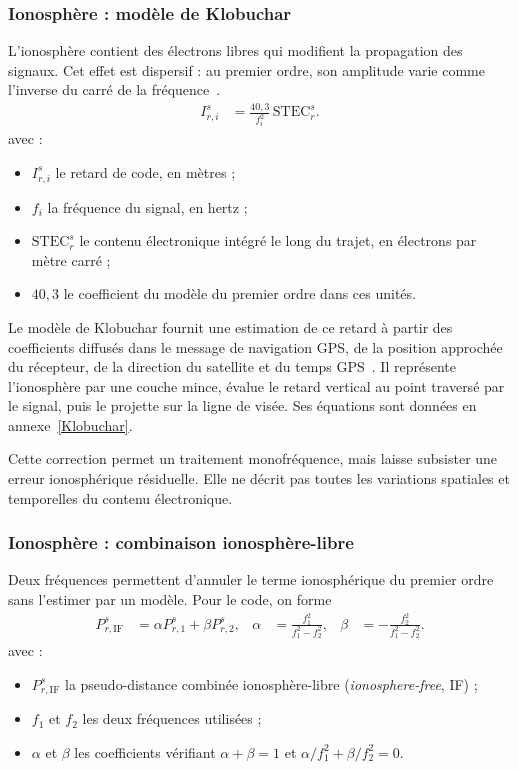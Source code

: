 \subsubsection{Ionosphère : modèle de Klobuchar}

L'ionosphère contient des électrons libres qui modifient la propagation des
signaux. Cet effet est dispersif : au premier ordre, son amplitude varie
comme l'inverse du carré de la fréquence~\cite{hauschild2017observations}.
\begin{align}
I_{r,i}^s&=\frac{40{,}3}{f_i^2}\,\mathrm{STEC}_r^s.
\label{new:iono}
\end{align}
avec :
\begin{itemize}
\item $I_{r,i}^s$ le retard de code, en mètres ;
\item $f_i$ la fréquence du signal, en hertz ;
\item $\mathrm{STEC}_r^s$ le contenu électronique intégré le long du trajet,
en électrons par mètre carré ;
\item $40{,}3$ le coefficient du modèle du premier ordre dans ces unités.
\end{itemize}

Le modèle de Klobuchar fournit une estimation de ce retard à partir des
coefficients diffusés dans le message de navigation GPS, de la position
approchée du récepteur, de la direction du satellite et du temps
GPS~\cite{klobuchar1987}. Il représente l'ionosphère par une couche mince,
évalue le retard vertical au point traversé par le signal, puis le projette
sur la ligne de visée. Ses équations sont données en annexe~\ref{Klobuchar}.

Cette correction permet un traitement monofréquence, mais laisse subsister
une erreur ionosphérique résiduelle. Elle ne décrit pas toutes les variations
spatiales et temporelles du contenu électronique.

\subsubsection{Ionosphère : combinaison ionosphère-libre}

Deux fréquences permettent d'annuler le terme ionosphérique du premier ordre
sans l'estimer par un modèle. Pour le code, on forme~\cite{hauschild2017combinations}
\begin{align}
P_{r,\mathrm{IF}}^s&=\alpha P_{r,1}^s+\beta P_{r,2}^s,
&
\alpha&=\frac{f_1^2}{f_1^2-f_2^2},
&
\beta&=-\frac{f_2^2}{f_1^2-f_2^2}.
\label{new:if}
\end{align}
avec :
\begin{itemize}
\item $P_{r,\mathrm{IF}}^s$ la pseudo-distance combinée ionosphère-libre
(\textit{ionosphere-free}, IF) ;
\item $f_1$ et $f_2$ les deux fréquences utilisées ;
\item $\alpha$ et $\beta$ les coefficients vérifiant
$\alpha+\beta=1$ et $\alpha/f_1^2+\beta/f_2^2=0$.
\end{itemize}

